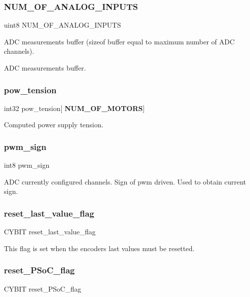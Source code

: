 \subsubsection{N\+U\+M\+\_\+\+O\+F\+\_\+\+A\+N\+A\+L\+O\+G\+\_\+\+I\+N\+P\+U\+TS}
{\footnotesize\ttfamily uint8 N\+U\+M\+\_\+\+O\+F\+\_\+\+A\+N\+A\+L\+O\+G\+\_\+\+I\+N\+P\+U\+TS}

A\+DC measurements buffer (sizeof buffer equal to maximum number of A\+DC channels).

A\+DC measurements buffer. \mbox{\label{globals_8h_a1c717f431f1d1ea4a500f6027102d001}} 
\subsubsection{pow\+\_\+tension}
{\footnotesize\ttfamily int32 pow\+\_\+tension[\textbf{ N\+U\+M\+\_\+\+O\+F\+\_\+\+M\+O\+T\+O\+RS}]}

Computed power supply tension. \mbox{\label{globals_8h_a8ac7ad7c894db750e93bc745818e26ca}} 
\subsubsection{pwm\+\_\+sign}
{\footnotesize\ttfamily int8 pwm\+\_\+sign}

A\+DC currently configured channels. Sign of pwm driven. Used to obtain current sign. \mbox{\label{globals_8h_aa89a782cfe75ce7970236babd308fe69}} 
\subsubsection{reset\+\_\+last\+\_\+value\+\_\+flag}
{\footnotesize\ttfamily C\+Y\+B\+IT reset\+\_\+last\+\_\+value\+\_\+flag}

This flag is set when the encoders last values must be resetted. \mbox{\label{globals_8h_a7f81d1d66186b1c7cd358ea7cfff2caf}} 
\subsubsection{reset\+\_\+\+P\+So\+C\+\_\+flag}
{\footnotesize\ttfamily C\+Y\+B\+IT reset\+\_\+\+P\+So\+C\+\_\+flag}

